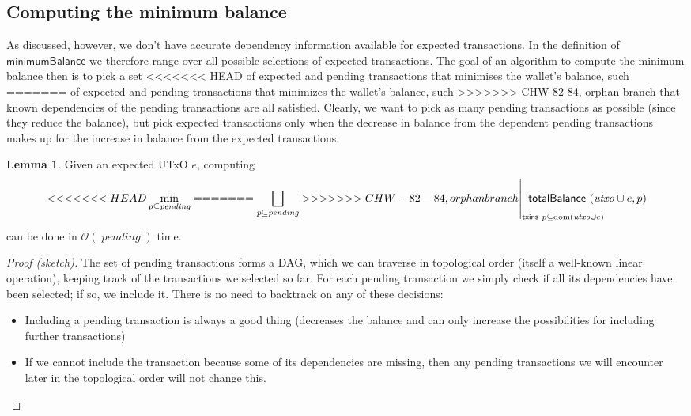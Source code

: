 \documentclass{article}
\newcommand{\order}[1]{\mathcal{O}\left(#1\right)}
\DeclareMathOperator{\dom}{dom}
\DeclareMathOperator*{\minimum}{min}
\theoremstyle{definition}{
  \newtheorem{lemma}{Lemma}[section] %
  \newtheorem{definition}[lemma]{Definition}
}
\theoremstyle{theorem}{
  \newtheorem{invariant}[lemma]{Invariant}
  \newtheorem{proofobligation}[lemma]{Proof Obligation}
}
\newtheorem{lemma}{Lemma}[section] %
\numberwithin{equation}{lemma}
\begin{document}
\subsection{Computing the minimum balance}

As discussed, however, we don't have accurate dependency information available
for expected transactions. In the definition of $\mathsf{minimumBalance}$ we
therefore range over all possible selections of expected transactions.
The goal of an algorithm to compute the minimum balance then is to pick a set
<<<<<<< HEAD
of expected and pending transactions that minimises the wallet's balance, such
=======
of expected and pending transactions that minimizes the wallet's balance, such
>>>>>>> CHW-82-84, orphan branch
that known dependencies of the pending transactions are all satisfied.
Clearly, we want to pick as many pending transactions as possible (since they
reduce the balance), but pick expected transactions only when the decrease in
balance from the dependent pending transactions makes up for the increase in
balance from the expected transactions.

\begin{lemma}
Given an expected UTxO $e$, computing
%
\begin{equation*}
  \left.
<<<<<<< HEAD
  \minimum_{p \subseteq \mathit{pending}}
=======
  \bigsqcup_{p \subseteq \mathit{pending}}
>>>>>>> CHW-82-84, orphan branch
  \right|_{\mathrlap{\mathsf{txins} ~ p \subseteq \dom(\mathit{utxo} \cup e)}}
  ~ \mathsf{totalBalance} ~ (\mathit{utxo} \cup e, p)
\end{equation*}
%
can be done in $\order{|\mathit{pending}|}$ time.
\end{lemma}

\begin{proof}[Proof (sketch)]
The set of pending transactions forms a DAG, which we can traverse in
topological order (itself a well-known linear operation), keeping track of the
transactions we selected so far. For each pending transaction we simply check if
all its dependencies have been selected; if so, we include it. There is no need
to backtrack on any of these decisions:

\begin{itemize}
\item Including a pending transaction is always a good thing (decreases the
balance and can only increase the possibilities for  including further
transactions)
\item If we cannot include the transaction because some of its dependencies
are missing, then any pending transactions we will encounter later in the
topological order will not change this.
\end{itemize}
\end{proof}
\end{document}
